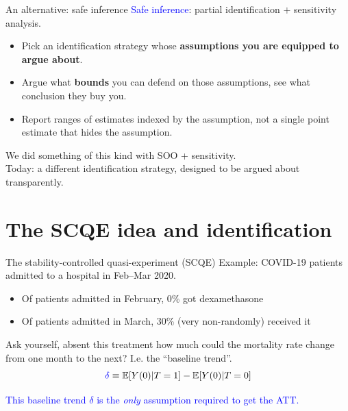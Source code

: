 \documentclass[xcolor=dvipsnames]{beamer}
\newcommand\makegaps{\addtolength{\itemsep}{.25\baselineskip}}
\newcommand\E{\mathbb{E}}
\begin{document}
\begin{frame}{An alternative: safe inference}
 \textcolor{blue}{Safe inference}: partial identification $+$ sensitivity analysis.\\
\bigskip
\small
\begin{itemize}\makegaps
  \item<2-> Pick an identification strategy whose \textbf{assumptions you are equipped to argue about}.
  \item<3-> Argue what \textbf{bounds} you can defend on those assumptions, see what conclusion they buy you.
  \item<4-> Report ranges of estimates indexed by the assumption, not a single point estimate that hides the assumption.
\end{itemize}
\bigskip
{} We did something of this kind with SOO + sensitivity. \\
\medskip
{} Today: a different identification strategy, designed to be argued about transparently.
\end{frame}

\section{The SCQE idea and identification}

\begin{frame}{The stability-controlled quasi-experiment (SCQE)}
\medskip
{} Example: COVID-19 patients admitted to a hospital in Feb--Mar 2020.\\
\small
\begin{itemize}
    \item Of patients admitted in February, 0\% got dexamethasone
    \item Of patients admitted in March, 30\% (very non-randomly) received it
\end{itemize}
\bigskip
\normalsize
{} Ask yourself, absent this treatment how much could the mortality rate change from one month to the next?  I.e. the ``baseline trend''. \\

\[\textcolor{blue}{\delta} \equiv \E[Y(0)|T=1] - \E[Y(0)|T=0]  \]

\bigskip
{}  \textcolor{blue}{This baseline trend $\delta$ is the \emph{only} assumption required to get the ATT.}

\end{frame}
\end{document}
